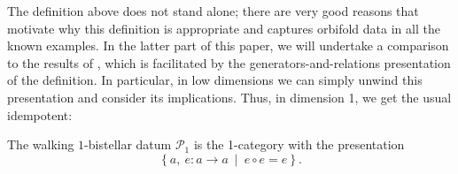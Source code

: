 \documentclass[12pt,a4paper]{article}
\numberwithin{equation}{section}
\begin{document}
The definition above does not stand alone; there are very good reasons that motivate why this definition is appropriate and captures orbifold data in all the known examples. In the latter part of this paper, we will undertake a comparison to the results of \cite{orbifold2d,orbifoldnd,orbifold3d,condensation}, which is facilitated by the generators-and-relations presentation of the definition. In particular, in low dimensions we can simply unwind this presentation and consider its implications. Thus, in dimension 1, we get the usual idempotent:
%
\begin{specialtheorem}
    The walking $1$-bistellar datum $\mathscr{P}_1$ is the 1-category with the presentation
    \begin{equation}
        \left\{ a,\  e:a \to a  \ \mid \ e \circ e = e\right\}.
    \end{equation}
\end{specialtheorem}
\end{document}
